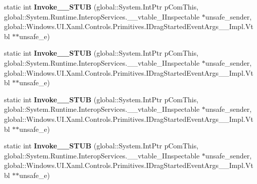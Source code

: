 \begin{DoxyCompactItemize}
\item 
\mbox{\label{struct_windows_1_1_u_i_1_1_xaml_1_1_controls_1_1_primitives_1_1_drag_started_event_handler_____impl_1_1_vtbl_a9276c9fcb95effe92780616f46b359e4}} 
static int {\bfseries Invoke\+\_\+\+\_\+\+S\+T\+UB} (global\+::\+System.\+Int\+Ptr p\+Com\+This, global\+::\+System.\+Runtime.\+Interop\+Services.\+\_\+\+\_\+vtable\+\_\+\+I\+Inspectable $\ast$unsafe\+\_\+sender, global\+::\+Windows.\+U\+I.\+Xaml.\+Controls.\+Primitives.\+I\+Drag\+Started\+Event\+Args\+\_\+\+\_\+\+Impl.\+Vtbl $\ast$$\ast$unsafe\+\_\+e)
\item 
\mbox{\label{struct_windows_1_1_u_i_1_1_xaml_1_1_controls_1_1_primitives_1_1_drag_started_event_handler_____impl_1_1_vtbl_a9276c9fcb95effe92780616f46b359e4}} 
static int {\bfseries Invoke\+\_\+\+\_\+\+S\+T\+UB} (global\+::\+System.\+Int\+Ptr p\+Com\+This, global\+::\+System.\+Runtime.\+Interop\+Services.\+\_\+\+\_\+vtable\+\_\+\+I\+Inspectable $\ast$unsafe\+\_\+sender, global\+::\+Windows.\+U\+I.\+Xaml.\+Controls.\+Primitives.\+I\+Drag\+Started\+Event\+Args\+\_\+\+\_\+\+Impl.\+Vtbl $\ast$$\ast$unsafe\+\_\+e)
\item 
\mbox{\label{struct_windows_1_1_u_i_1_1_xaml_1_1_controls_1_1_primitives_1_1_drag_started_event_handler_____impl_1_1_vtbl_a9276c9fcb95effe92780616f46b359e4}} 
static int {\bfseries Invoke\+\_\+\+\_\+\+S\+T\+UB} (global\+::\+System.\+Int\+Ptr p\+Com\+This, global\+::\+System.\+Runtime.\+Interop\+Services.\+\_\+\+\_\+vtable\+\_\+\+I\+Inspectable $\ast$unsafe\+\_\+sender, global\+::\+Windows.\+U\+I.\+Xaml.\+Controls.\+Primitives.\+I\+Drag\+Started\+Event\+Args\+\_\+\+\_\+\+Impl.\+Vtbl $\ast$$\ast$unsafe\+\_\+e)
\item 
\mbox{\label{struct_windows_1_1_u_i_1_1_xaml_1_1_controls_1_1_primitives_1_1_drag_started_event_handler_____impl_1_1_vtbl_a9276c9fcb95effe92780616f46b359e4}} 
static int {\bfseries Invoke\+\_\+\+\_\+\+S\+T\+UB} (global\+::\+System.\+Int\+Ptr p\+Com\+This, global\+::\+System.\+Runtime.\+Interop\+Services.\+\_\+\+\_\+vtable\+\_\+\+I\+Inspectable $\ast$unsafe\+\_\+sender, global\+::\+Windows.\+U\+I.\+Xaml.\+Controls.\+Primitives.\+I\+Drag\+Started\+Event\+Args\+\_\+\+\_\+\+Impl.\+Vtbl $\ast$$\ast$unsafe\+\_\+e)

\end{DoxyCompactItemize}
